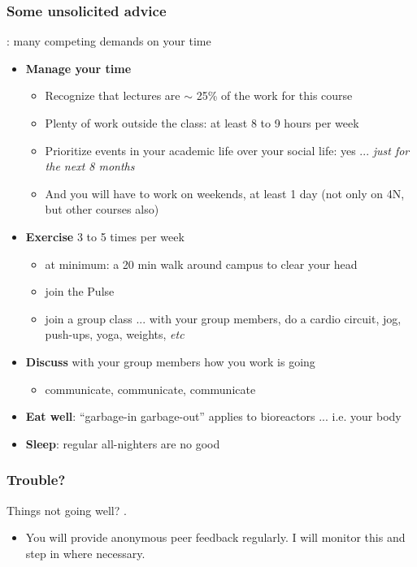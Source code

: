\begin{frame}\frametitle{Some unsolicited advice}
	\begin{exampleblock}{}
		{} : many competing demands on your time
	\end{exampleblock}	
	\begin{itemize}		
		\item	\textbf{Manage your time}
		\begin{itemize}
			\item	Recognize that lectures are $\sim$ 25\% of the work for this course
			\item	Plenty of work outside the class: at least 8 to 9 hours per week
			\item	Prioritize events in your academic life over your social life: yes ... \emph{just for the next 8 months}
			\item	And you will have to work on weekends, at least 1 day (not only on 4N, but other courses also)
		\end{itemize}
		\pause
		\item	\textbf{Exercise} 3 to 5 times per week
		\begin{itemize}
			\item	at minimum: a 20 min walk around campus to clear your head
			\item	join the Pulse
			\item	join a group class ... with your group members, do a cardio circuit, jog, push-ups, yoga, weights, \emph{etc}
		\end{itemize}		
		\pause
		\item	\textbf{Discuss} with your group members how you work is going
		\begin{itemize}
			\item	communicate, communicate, communicate
		\end{itemize}
		\item	\textbf{Eat well}: ``garbage-in garbage-out'' applies to bioreactors ... i.e. your body
		\item	\textbf{Sleep}: regular all-nighters are no good
	\end{itemize}	
\end{frame}

\begin{frame}\frametitle{Trouble?}
	\begin{exampleblock}{}
		\vspace{12pt}
		Things not going well? {}.
		\vspace{12pt}
	\end{exampleblock}
	\begin{itemize}
		\item	You will provide anonymous peer feedback regularly. I will monitor this and step in where necessary.
	\end{itemize}
\end{frame}

